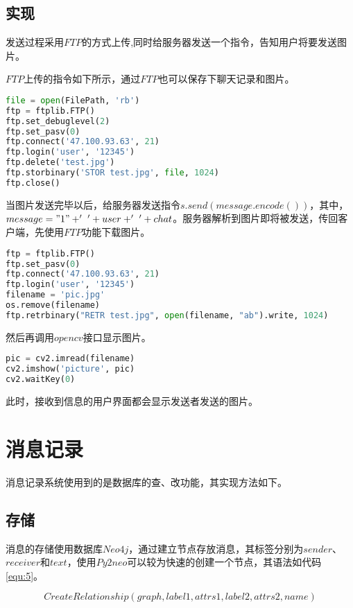\documentclass[forprint]{OSPaper}
\begin{document}
\subsection{实现}

发送过程采用$FTP$的方式上传,同时给服务器发送一个指令，告知用户将要发送图片。

$FTP$上传的指令如下所示，通过$FTP$也可以保存下聊天记录和图片。

\begin{lstlisting}[language=Python]
file = open(FilePath, 'rb')
ftp = ftplib.FTP()
ftp.set_debuglevel(2)
ftp.set_pasv(0)
ftp.connect('47.100.93.63', 21)
ftp.login('user', '12345')
ftp.delete('test.jpg')
ftp.storbinary('STOR test.jpg', file, 1024)
ftp.close()
\end{lstlisting}

当图片发送完毕以后，给服务器发送指令$s.send(message.encode())$，其中，$message = "1" + '~' + user + '~' + chat$。服务器解析到图片即将被发送，传回客户端，先使用$FTP$功能下载图片。

\begin{lstlisting}[language=Python]
ftp = ftplib.FTP()
ftp.set_pasv(0)
ftp.connect('47.100.93.63', 21)
ftp.login('user', '12345')
filename = 'pic.jpg'
os.remove(filename)
ftp.retrbinary("RETR test.jpg", open(filename, "ab").write, 1024)
\end{lstlisting}

然后再调用$opencv$接口显示图片。

\begin{lstlisting}[language=Python]
pic = cv2.imread(filename)
cv2.imshow('picture', pic)
cv2.waitKey(0)
\end{lstlisting}

此时，接收到信息的用户界面都会显示发送者发送的图片。

\section{消息记录}

消息记录系统使用到的是数据库的查、改功能，其实现方法如下。

\subsection{存储}

消息的存储使用数据库$Neo4j$，通过建立节点存放消息，其标签分别为$sender$、$receiver$和$text$，使用$Py2neo$可以较为快速的创建一个节点，其语法如代码\ref{equ:5}。

\begin{equation}
	\label{equ:5}
	CreateRelationship(graph, label1, attrs1, label2, attrs2, name)
\end{equation}
\end{document}
